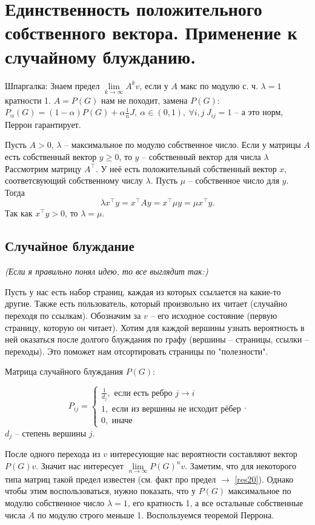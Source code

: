 \section{
 Единственность положительного собственного вектора. Применение к случайному блужданию.
}

Шпаргалка: Знаем предел $\lim\limits_{k\to\infty}A^kv$, если у $ A $ макс по модулю с. ч. $\lambda=1$ кратности 1. $A=P(G)$ нам не походит, замена $P(G)$: $P_{\alpha}(G)=(1-\alpha) P(G) + \alpha\tfrac{1}{n}J,\ \alpha \in (0,1),\ \forall i,j\ J_{ij}=1 $ -- а это норм, Перрон гарантирует.

\lm Пусть $A>0$, $\lambda$ -- максимальное по модулю собственное число. Если у матрицы $A$ есть собственный вектор $y\geq 0$, то $y$ -- собственный вектор для числа $\lambda$
\elm
\proof Рассмотрим матрицу $A^{\top}$. У неё есть положительный  собственный вектор $x$, соответсвующий собственному числу $\lambda$. Пусть $\mu$ -- собственное число для $y$. Тогда 
$$\lambda x^{\top}y= x^{\top}Ay=x^{\top}\mu y=\mu x^{\top}y.$$
Так как $x^{\top}y >0$, то $\lambda=\mu$.
\endproof

\subsection*{Случайное блуждание}

\textit{(Если я правильно понял идею, то все выглядит так:)}

Пусть у нас есть набор страниц, каждая из которых ссылается на какие-то другие. Также есть пользователь, который произвольно их читает (случайно переходя по ссылкам). Обозначим за $v$ -- его исходное состояние (первую страницу, которую он читает). Хотим для каждой вершины узнать вероятность в ней оказаться после долгого блуждания по графу (вершины -- страницы, ссылки -- переходы). Это поможет нам отсортировать страницы по "полезности".

\dfn
  Матрица случайного блуждания  $P(G)$:

  $$ P_{ij}=\begin{cases}
  \frac{1}{d_j}, \text{ если есть ребро $j\to i$}\\
  1, \text{ если из вершины не исходит рёбер} \\
  0, \text{ иначе }
  \end{cases}. $$
  $d_j$ -- степень вершины $j$.
\edfn

После одного перехода из $v$ интересующие нас вероятности составляют вектор $P(G)v$. Значит нас интересует $\lim\limits_{n \to \infty}P(G)^nv$. Заметим, что для некоторого типа матриц такой предел известен (см. факт про предел $\rightarrow$ \ref{res20}). Однако чтобы этим воспользоваться, нужно показать, что у $P(G)$ максимальное по модулю собственное число $\lambda=1$, его кратность 1, а все остальные собственные числа $A$ по модулю строго меньше 1. Воспользуемся теоремой Перрона.

